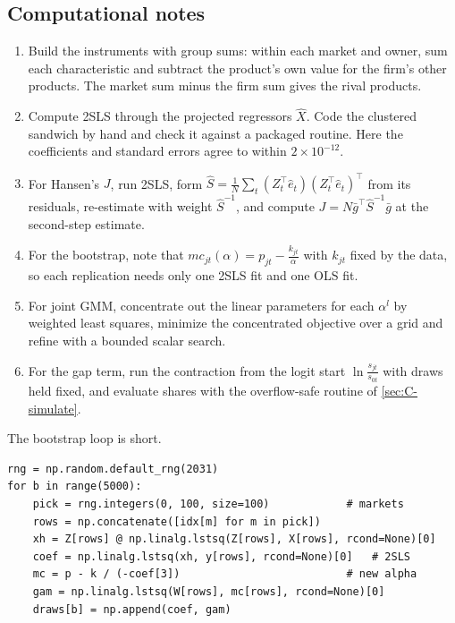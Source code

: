 \subsection{Computational notes}

\begin{enumerate}
  \item Build the instruments with group sums: within each market and owner, sum each characteristic and subtract the
  product's own value for the firm's other products. The market sum minus the firm sum gives the rival products.
  \item Compute 2SLS through the projected regressors $\hat X$. Code the clustered sandwich by hand and check it against
  a packaged routine. Here the coefficients and standard errors agree to within $2\times10^{-12}$.
  \item For Hansen's $J$, run 2SLS, form $\hat S = \frac{1}{N}\sum_t(Z_t^\top\hat e_t)(Z_t^\top\hat e_t)^\top$ from its
  residuals, re-estimate with weight $\hat S^{-1}$, and compute $J = N\bar g^\top\hat S^{-1}\bar g$ at the second-step
  estimate.
  \item For the bootstrap, note that $mc_{jt}(\alpha) = p_{jt} - \frac{k_{jt}}{\alpha}$ with $k_{jt}$ fixed by the data,
  so each replication needs only one 2SLS fit and one OLS fit.
  \item For joint GMM, concentrate out the linear parameters for each $\alpha^l$ by weighted least squares, minimize the
  concentrated objective over a grid and refine with a bounded scalar search.
  \item For the gap term, run the contraction from the logit start $\ln\frac{s_{jt}}{s_{0t}}$ with draws held fixed, and
  evaluate shares with the overflow-safe routine of \cref{sec:C-simulate}.
\end{enumerate}
The bootstrap loop is short.
\begin{verbatim}
rng = np.random.default_rng(2031)
for b in range(5000):
    pick = rng.integers(0, 100, size=100)            # markets
    rows = np.concatenate([idx[m] for m in pick])
    xh = Z[rows] @ np.linalg.lstsq(Z[rows], X[rows], rcond=None)[0]
    coef = np.linalg.lstsq(xh, y[rows], rcond=None)[0]   # 2SLS
    mc = p - k / (-coef[3])                          # new alpha
    gam = np.linalg.lstsq(W[rows], mc[rows], rcond=None)[0]
    draws[b] = np.append(coef, gam)
\end{verbatim}
